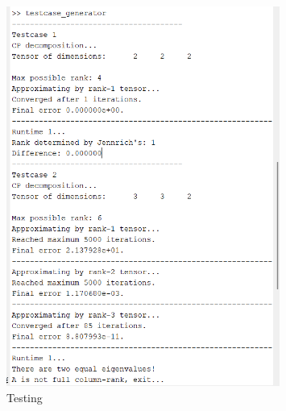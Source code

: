 \begin{figure}[ht]
    \centering
    \includegraphics[width=0.8\textwidth]{img/tests.png}
    \caption{Testing}
    \label{fig:tests}
\end{figure}